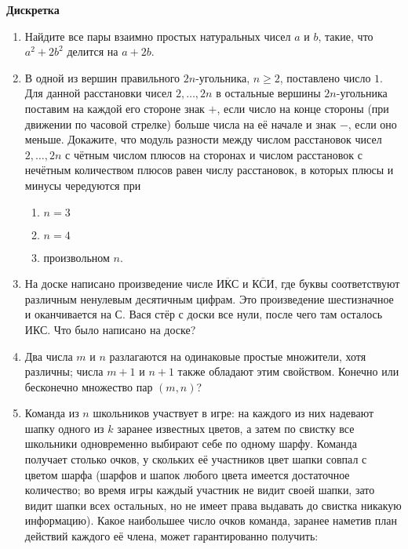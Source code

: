 


  \clearpage
  \pagestyle{empty}
  {\Large\bf Дискретка}
  \begin{enumerate}
    \item Найдите все пары взаимно простых натуральных чисел $a$ и $b$, такие, что $a^2 + 2b^2$ делится на $a+2b$.
    \item В одной из вершин правильного $2n$-угольника, $n\ge2$, поставлено число $1$. Для данной расстановки чисел $2,\dots,2n$ в остальные 
    вершины $2n$-угольника поставим на каждой его стороне знак $+$, если число на конце стороны (при движении по часовой стрелке)
    больше числа на её начале и знак $-$, если оно меньше. Докажите, что модуль разности между числом расстановок чисел $2,\dots,2n$ с
    чётным числом плюсов на сторонах и числом расстановок с нечётным количеством плюсов равен числу расстановок, в которых плюсы и минусы
    чередуются при 
      \begin{enumerate}[label=(\asbuk*)]
        \item $n=3$
        \item $n=4$
        \item произвольном $n$.
      \end{enumerate}
    \item На доске написано произведение числе $\overline{\text{ИКС}}$ и $\overline{\text{КСИ}}$, где буквы соответствуют различным
    ненулевым десятичным цифрам. Это произведение шестизначное и оканчивается на С. Вася стёр с доски все нули, после чего там осталось
    ИКС. Что было написано на доске?
    \item Два числа $m$ и $n$ разлагаются на одинаковые простые множители, хотя различны; числа $m+1$ и $n+1$ также обладают этим свойством.
    Конечно или бесконечно множество пар $(m, n)$?
    \item Команда из $n$ школьников участвует в игре: на каждого из них надевают шапку одного из $k$ заранее известных
    цветов, а затем по свистку все школьники одновременно выбирают себе по одному шарфу. Команда получает столько
    очков, у скольких её участников цвет шапки совпал с цветом шарфа (шарфов и шапок любого цвета имеется достаточное
    количество; во время игры каждый участник не видит своей шапки, зато видит шапки всех остальных, но не имеет права
    выдавать до свистка никакую информацию). Какое наибольшее число очков команда, заранее наметив план действий
    каждого её члена, может гарантированно получить:
      \begin{enumerate}[label=(\asbuk*)]

\end{enumerate}
\end{enumerate}
